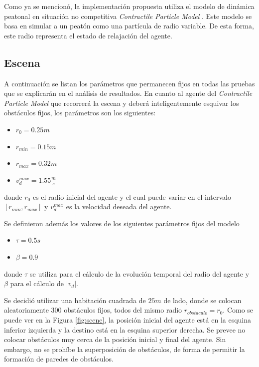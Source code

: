 \documentclass[a4paper,10pt]{article}
\begin{document}
Como ya se mencionó, la implementación propuesta utiliza el modelo de dinámica peatonal en situación no competitiva \textit{Contractile Particle Model} \cite{parisi}. Este modelo se basa en simular a un peatón como una partícula de radio variable. De esta forma, este radio representa el estado de relajación del agente. 

\subsection{Escena}

A continuación se listan los parámetros que permanecen fijos en todas las pruebas que se explicarán en el análisis de resultados.
En cuanto al agente del \textit{Contractile Particle Model} que recorrerá la escena y deberá inteligentemente esquivar los obstáculos fijos, los parámetros son los siguientes:
\begin{itemize}
	\item $r_{0} = 0.25m$
	\item $r_{min} = 0.15m$
	\item $r_{max} = 0.32m$
	\item $v_{d}^{max} = 1.55 \frac{m}{s}$
\end{itemize}
donde $r_{0}$ es el radio inicial del agente y el cual puede variar en el intervalo $[ r_{min} , r_{max} ]$ y $v_{d}^{max}$ es la velocidad deseada del agente.

Se definieron además los valores de los siguientes parámetros fijos del modelo
\begin{itemize}
		\item $\tau = 0.5s$
		\item $\beta = 0.9$
\end{itemize}
donde $\tau$ se utiliza para el cálculo de la evolución temporal del radio del agente y $\beta$ para el cálculo de $|v_{d}|$. 

Se decidió utilizar una habitación cuadrada de $25m$ de lado, donde se colocan aleatoriamente 300 obstáculos fijos, todos del mismo radio $r_{obstaculo} = r_{0}$. Como se puede ver en la Figura \ref{fig:scene}, la posición inicial del agente está en la esquina inferior izquierda y la destino está en la esquina superior derecha. Se prevee no colocar obstáculos muy cerca de la posición inicial y final del agente. Sin embargo, no se prohíbe la superposición de obstáculos, de forma de permitir la formación de paredes de obstáculos.
\end{document}
